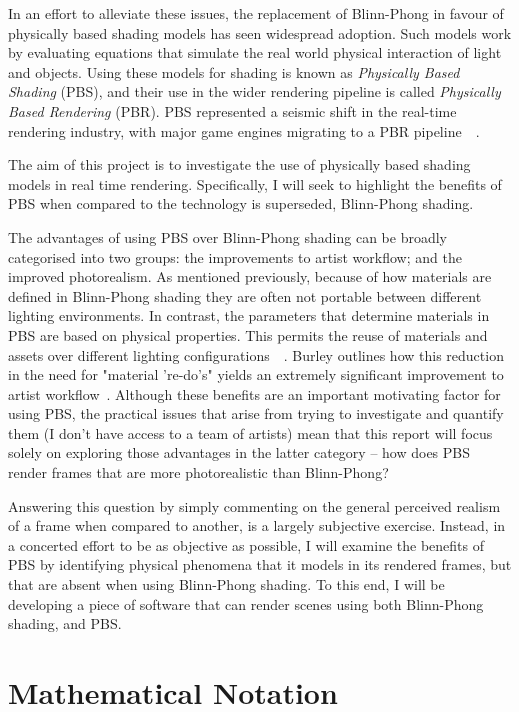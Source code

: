 In an effort to alleviate these issues, the replacement of Blinn-Phong in favour of physically based shading models has seen widespread adoption. Such models work by evaluating equations that simulate the real world physical interaction of light and objects. Using these models for shading is known as \textit{Physically Based Shading} (PBS), and their use in the wider rendering pipeline is called \textit{Physically Based Rendering} (PBR). PBS represented a seismic shift in the real-time rendering industry, with major game engines migrating to a PBR pipeline~\cite{RealShadingInUnreal}~\cite{movingFrostbitetoPBR}.

The aim of this project is to investigate the use of physically based shading models in real time rendering. Specifically, I will seek to highlight the benefits of PBS when compared to the technology is superseded, Blinn-Phong shading.

The advantages of using PBS over Blinn-Phong shading can be broadly categorised into two groups: the improvements to artist workflow; and the improved photorealism. As mentioned previously, because of how materials are defined in Blinn-Phong shading they are often not portable between different lighting environments. In contrast, the parameters that determine materials in PBS are based on physical properties. This permits the reuse of materials and assets over different lighting configurations~\cite{movingFrostbitetoPBR}~\cite{SIGGRAPH2020Course}. Burley outlines how this reduction in the need for "material 're-do's" yields an extremely significant improvement to artist workflow~\cite{Burley2012Physically}. Although these benefits are an important motivating factor for using PBS, the practical issues that arise from trying to investigate and quantify them (I don’t have access to a team of artists) mean that this report will focus solely on exploring those advantages in the latter category – how does PBS render frames that are more photorealistic than Blinn-Phong?

Answering this question by simply commenting on the general perceived realism of a frame when compared to another, is a largely subjective exercise. Instead, in a concerted effort to be as objective as possible, I will examine the benefits of PBS by identifying physical phenomena that it models in its rendered frames, but that are absent when using Blinn-Phong shading. To this end, I will be developing a piece of software that can render scenes using both Blinn-Phong shading, and PBS.

\section{Mathematical Notation}

